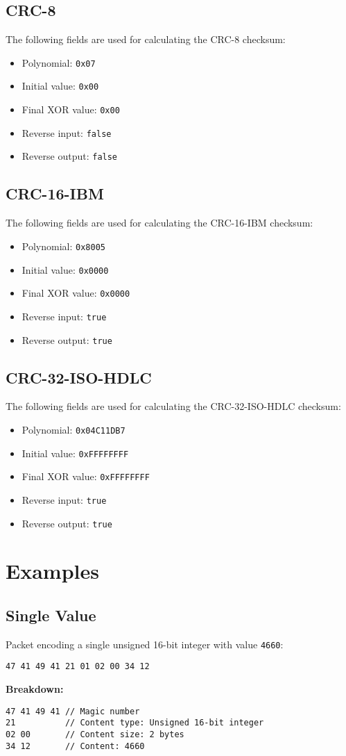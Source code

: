\documentclass[a4paper]{article}
\begin{document}
\subsection*{CRC-8}
The following fields are used for calculating the CRC-8 checksum:
\begin{itemize}
  \item Polynomial: \texttt{0x07}
  \item Initial value: \texttt{0x00}
  \item Final XOR value: \texttt{0x00}
  \item Reverse input: \texttt{false}
  \item Reverse output: \texttt{false}
\end{itemize}

\subsection*{CRC-16-IBM}
The following fields are used for calculating the CRC-16-IBM checksum:
\begin{itemize}
  \item Polynomial: \texttt{0x8005}
  \item Initial value: \texttt{0x0000}
  \item Final XOR value: \texttt{0x0000}
  \item Reverse input: \texttt{true}
  \item Reverse output: \texttt{true}
\end{itemize}

\subsection*{CRC-32-ISO-HDLC}
The following fields are used for calculating the CRC-32-ISO-HDLC checksum:
\begin{itemize}
  \item Polynomial: \texttt{0x04C11DB7}
  \item Initial value: \texttt{0xFFFFFFFF}
  \item Final XOR value: \texttt{0xFFFFFFFF}
  \item Reverse input: \texttt{true}
  \item Reverse output: \texttt{true}
\end{itemize}

\section*{Examples}
\subsection*{Single Value}
Packet encoding a single unsigned 16-bit integer with value \texttt{4660}:
\begin{verbatim}
47 41 49 41 21 01 02 00 34 12
\end{verbatim}
\textbf{Breakdown:}
\begin{verbatim}
47 41 49 41 // Magic number
21          // Content type: Unsigned 16-bit integer
02 00       // Content size: 2 bytes
34 12       // Content: 4660
\end{verbatim}
\end{document}
